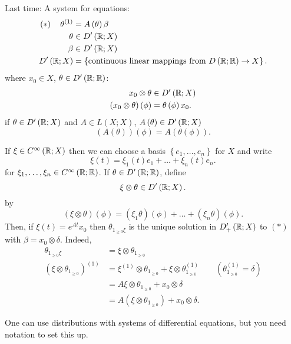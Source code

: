 
Last time: A system for equations:
\begin{align*}
	\left( *  \right) \quad	\theta ^{\left( 1 \right) } &=  A\left( \theta \right) \beta \\
	\theta &\in D'\left( \mathbb{R}; X \right)   \\
	\beta &\in D'\left( \mathbb{R}; X \right) \\
	D'\left( \mathbb{R}; X \right) &= \left\{ \text{continuous linear mappings from }D\left( \mathbb{R}; \mathbb{R} \right) \to X \right\} 
.\end{align*}
where $x_0 \in  X$, $\theta \in  D'\left( \mathbb{R}; \mathbb{R} \right) $:
\begin{align*}
	x_0 \otimes \theta &\in  D'\left( \mathbb{R}; X \right) \\
	\left( x_0 \otimes \theta  \right) \left( \phi \right)  &= \theta \left( \phi \right) x_0
.\end{align*}
if $\theta \in  D'\left( \mathbb{R}; X \right) $ and $A \in  L\left( X; X \right) $, $A\left( \theta  \right) \in  D'\left( \mathbb{R}; X \right) $ 
\[
	\left( A\left( \theta  \right)  \right) \left( \phi \right)  = A\left( \theta \left( \phi \right)  \right) 
.\] 

\begin{notation}
	If $\xi \in  C^{\infty}\left( \mathbb{R}; X \right) $ then we can choose a basis $\left\{ e_{1} , \ldots , e_{n} \right\} $ for $X$ and write 
	\[
		\xi\left( t \right)  = \xi_{1}\left( t \right) e_1 + \ldots + \xi_{n}\left( t \right) e_{n}
	.\] 
	for $\xi_{1} , \ldots , \xi_{n} \in  C^{\infty}\left( \mathbb{R}; \mathbb{R} \right) $. If $\theta \in  D'\left( \mathbb{R}; \mathbb{R} \right) $, define 
	\[
		\xi \otimes \theta \in  D'\left( \mathbb{R}; X \right) 
	.\] by
	\[
		\left( \xi \otimes \theta  \right) \left( \phi \right)  = \left( \xi _{1} \theta  \right) \left( \phi \right)  + \ldots + \left( \xi _{n}\theta  \right) \left( \phi \right) 
	.\] 
	Then, if $\xi\left( t \right)  = e^{At}x_0$ then $\theta _{1 _{\ge 0}\xi}$ is the unique solution in $D'_{+}\left( \mathbb{R}; X \right) $ to $\left( * \right) $ with $\beta = x_0 \otimes \delta$. Indeed, 
	\begin{align*}
		\theta _{1_{\ge 0 }\xi} &= \xi \otimes \theta _{1 _{\ge 0}} \\
		\left( \xi \otimes \theta _{1 _{\ge  0}} \right) ^{\left( 1 \right) } &=  \xi ^{\left( 1 \right) } \otimes \theta _{1 _{\ge  0}} + \xi \otimes \theta _{1 _{\ge  0}}^{\left( 1 \right) } \quad\quad  \left(  \theta _{1 _{\ge  0}}^{\left( 1 \right) } = \delta\right) \\
		&= A\xi \otimes \theta _{1 _{\ge 0}} + x_0 \otimes \delta  \\
		&= A\left( \xi \otimes \theta _{1 _{\ge  0}} \right)  + x_0 \otimes \delta
	.\end{align*}
	\begin{punch}
	One can use distributions with systems of differential equations, but you need notation to set this up.
	\end{punch}
\end{notation}

